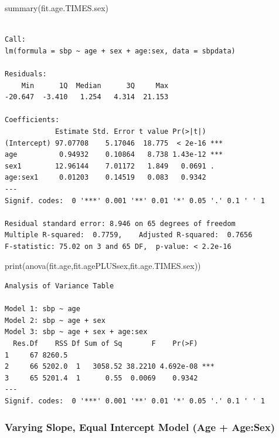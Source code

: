 \documentclass[
  letterpaper,
]{scrbook}
\newenvironment{Shaded}{\begin{snugshade}}{\end{snugshade}}
\newcommand{\FunctionTok}[1]{\textcolor[rgb]{0.28,0.35,0.67}{#1}}
\newcommand{\NormalTok}[1]{\textcolor[rgb]{0.00,0.23,0.31}{#1}}
\begin{document}
\begin{Shaded}
\begin{Highlighting}[]
\FunctionTok{summary}\NormalTok{(fit.age.TIMES.sex)}
\end{Highlighting}
\end{Shaded}

\begin{verbatim}

Call:
lm(formula = sbp ~ age + sex + age:sex, data = sbpdata)

Residuals:
    Min      1Q  Median      3Q     Max 
-20.647  -3.410   1.254   4.314  21.153 

Coefficients:
            Estimate Std. Error t value Pr(>|t|)    
(Intercept) 97.07708    5.17046  18.775  < 2e-16 ***
age          0.94932    0.10864   8.738 1.43e-12 ***
sex1        12.96144    7.01172   1.849   0.0691 .  
age:sex1     0.01203    0.14519   0.083   0.9342    
---
Signif. codes:  0 '***' 0.001 '**' 0.01 '*' 0.05 '.' 0.1 ' ' 1

Residual standard error: 8.946 on 65 degrees of freedom
Multiple R-squared:  0.7759,    Adjusted R-squared:  0.7656 
F-statistic: 75.02 on 3 and 65 DF,  p-value: < 2.2e-16
\end{verbatim}

\begin{Shaded}
\begin{Highlighting}[]
\FunctionTok{print}\NormalTok{(}\FunctionTok{anova}\NormalTok{(fit.age,fit.agePLUSsex,fit.age.TIMES.sex))}
\end{Highlighting}
\end{Shaded}

\begin{verbatim}
Analysis of Variance Table

Model 1: sbp ~ age
Model 2: sbp ~ age + sex
Model 3: sbp ~ age + sex + age:sex
  Res.Df    RSS Df Sum of Sq       F    Pr(>F)    
1     67 8260.5                                   
2     66 5202.0  1   3058.52 38.2210 4.692e-08 ***
3     65 5201.4  1      0.55  0.0069    0.9342    
---
Signif. codes:  0 '***' 0.001 '**' 0.01 '*' 0.05 '.' 0.1 ' ' 1
\end{verbatim}

\subsubsection{Varying Slope, Equal Intercept Model (Age +
Age:Sex)}\label{varying-slope-equal-intercept-model-age-agesex}
\end{document}
